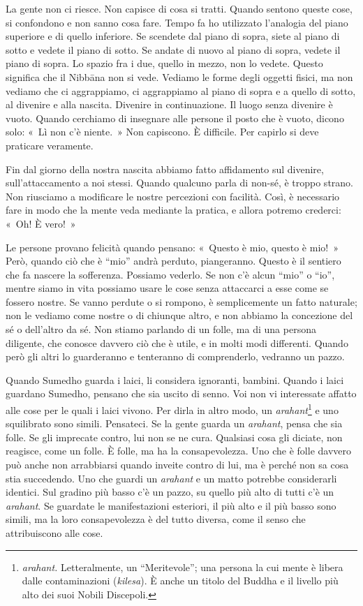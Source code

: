 La gente non ci riesce. Non capisce di cosa si tratti. Quando sentono
queste cose, si confondono e non sanno cosa fare. Tempo fa ho utilizzato
l'analogia del piano superiore e di quello inferiore. Se scendete dal
piano di sopra, siete al piano di sotto e vedete il piano di sotto. Se
andate di nuovo al piano di sopra, vedete il piano di sopra. Lo spazio
fra i due, quello in mezzo, non lo vedete. Questo significa che il
Nibbāna non si vede. Vediamo le forme degli oggetti fisici, ma
non vediamo che ci aggrappiamo, ci aggrappiamo al piano di sopra e a
quello di sotto, al divenire e alla nascita. Divenire in continuazione.
Il luogo senza divenire è vuoto. Quando cerchiamo di insegnare alle
persone il posto che è vuoto, dicono solo: «~Lì non c'è niente.~» Non
capiscono. È difficile. Per capirlo si deve praticare veramente.

Fin dal giorno della nostra nascita abbiamo fatto affidamento sul
divenire, sull'attaccamento a noi stessi. Quando qualcuno parla di
non-sé, è troppo strano. Non riusciamo a modificare le nostre percezioni
con facilità. Così, è necessario fare in modo che la mente veda mediante
la pratica, e allora potremo crederci: «~Oh! È vero!~»

Le persone provano felicità quando pensano: «~Questo è mio, questo è
mio!~» Però, quando ciò che è ``mio'' andrà perduto, piangeranno. Questo
è il sentiero che fa nascere la sofferenza. Possiamo vederlo. Se non c'è
alcun ``mio'' o ``io'', mentre siamo in vita possiamo usare le cose
senza attaccarci a esse come se fossero nostre. Se vanno perdute o si
rompono, è semplicemente un fatto naturale; non le vediamo come nostre o
di chiunque altro, e non abbiamo la concezione del sé o dell'altro da
sé. Non stiamo parlando di un folle, ma di una persona diligente, che
conosce davvero ciò che è utile, e in molti modi differenti. Quando però
gli altri lo guarderanno e tenteranno di comprenderlo, vedranno un
pazzo.

Quando Sumedho guarda i laici, li considera ignoranti, bambini. Quando i
laici guardano Sumedho, pensano che sia uscito di senno. Voi non vi
interessate affatto alle cose per le quali i laici vivono. Per dirla in
altro modo, un \emph{arahant}\footnote{\emph{arahant.} Letteralmente, un
  ``Meritevole''; una persona la cui mente è libera dalle contaminazioni
  (\emph{kilesa}). È anche un titolo del Buddha e il livello più alto
  dei suoi Nobili Discepoli.} e uno squilibrato sono simili. Pensateci.
Se la gente guarda un \emph{arahant}, pensa che sia folle. Se gli
imprecate contro, lui non se ne cura. Qualsiasi cosa gli diciate, non
reagisce, come un folle. È folle, ma ha la consapevolezza. Uno che è
folle davvero può anche non arrabbiarsi quando inveite contro di lui, ma
è perché non sa cosa stia succedendo. Uno che guardi un \emph{arahant} e
un matto potrebbe considerarli identici. Sul gradino più basso c'è un
pazzo, su quello più alto di tutti c'è un \emph{arahant}. Se guardate le
manifestazioni esteriori, il più alto e il più basso sono simili, ma la
loro consapevolezza è del tutto diversa, come il senso che attribuiscono
alle cose.

